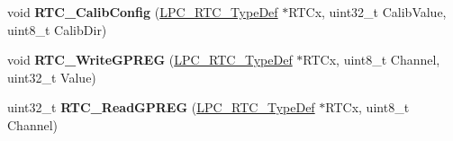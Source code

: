 \begin{DoxyCompactItemize}
\item 
\hypertarget{group___r_t_c___public___functions_ga6f38396a898bb32decad78bca7e10741}{void {\bfseries \-R\-T\-C\-\_\-\-Calib\-Config} (\hyperlink{struct_l_p_c___r_t_c___type_def}{\-L\-P\-C\-\_\-\-R\-T\-C\-\_\-\-Type\-Def} $\ast$\-R\-T\-Cx, uint32\-\_\-t \-Calib\-Value, uint8\-\_\-t \-Calib\-Dir)}\label{group___r_t_c___public___functions_ga6f38396a898bb32decad78bca7e10741}

\item 
\hypertarget{group___r_t_c___public___functions_gab5b83990fd574b03acee554577ca7e2a}{void {\bfseries \-R\-T\-C\-\_\-\-Write\-G\-P\-R\-E\-G} (\hyperlink{struct_l_p_c___r_t_c___type_def}{\-L\-P\-C\-\_\-\-R\-T\-C\-\_\-\-Type\-Def} $\ast$\-R\-T\-Cx, uint8\-\_\-t \-Channel, uint32\-\_\-t \-Value)}\label{group___r_t_c___public___functions_gab5b83990fd574b03acee554577ca7e2a}

\item 
\hypertarget{group___r_t_c___public___functions_ga1e8d68a31af769069a5bd2f7b9f93327}{uint32\-\_\-t {\bfseries \-R\-T\-C\-\_\-\-Read\-G\-P\-R\-E\-G} (\hyperlink{struct_l_p_c___r_t_c___type_def}{\-L\-P\-C\-\_\-\-R\-T\-C\-\_\-\-Type\-Def} $\ast$\-R\-T\-Cx, uint8\-\_\-t \-Channel)}\label{group___r_t_c___public___functions_ga1e8d68a31af769069a5bd2f7b9f93327}

\end{DoxyCompactItemize}
